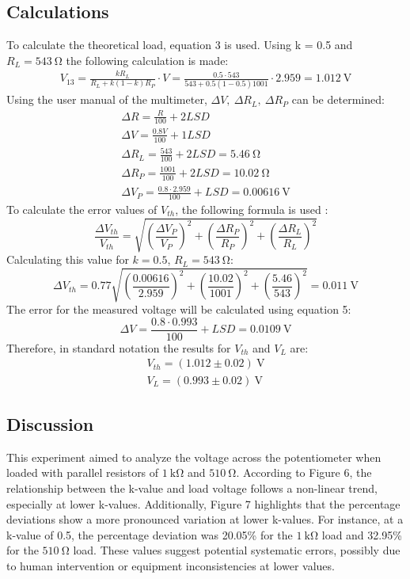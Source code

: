 \documentclass[a4paper]{article}
\newcommand{\unit}[1]{~\mathrm{#1}}
\begin{document}
\subsection{Calculations}
To calculate the theoretical load, equation 3 is used. Using k = 0.5 and $R_L =
543\unit{\Omega}$ the following calculation is made:
\begin{gather*}
    V_{13} = \frac{kR_L}{R_L + k(1-k) R_P} \cdot V = \frac{0.5 \cdot 543}{543 + 0.5(1-0.5)1001} \cdot 2.959 = 1.012\unit{V}
\end{gather*}
Using the user manual of the multimeter, $\Delta V, ~\Delta R_L, ~\Delta R_P$ can
be determined\cite{noauthor_am-500_2019}:
\begin{gather}
    \Delta R = \frac{R}{100} + 2LSD\\
    \Delta V = \frac{0.8 V}{100} + 1LSD\\
    \Delta R_L = \frac{543}{100} + 2LSD = 5.46\unit{\Omega} \nonumber \\
    \Delta R_P = \frac{1001}{100} + 2LSD = 10.02\unit{\Omega} \nonumber \\
    \Delta V_P = \frac{0.8 \cdot 2.959}{100} + LSD = 0.00616\unit{V} \nonumber
\end{gather} 
To calculate the error values of $V_{th}$, the following formula is used \cite{unc}:
\begin{equation}
    \frac{\Delta V_{th}}{V_{th}} = \sqrt{\left( \frac{\Delta V_P}{V_P}\right) ^2 + \left( \frac{\Delta R_P}{R_P} \right) ^ 2 + \left( \frac{\Delta R_L}{R_L} \right) ^2}
\end{equation}
Calculating this value for $k = 0.5$, $R_L = 543\unit{\Omega}$:
\[ \Delta V_{th} = 0.77 \sqrt{\left( \frac{0.00616}{2.959} \right) ^ 2 + \left(
\frac{10.02}{1001} \right) ^2 + \left(\frac{5.46}{543} \right) ^2 } = 0.011
\unit{V} \]
The error for the measured voltage will be calculated using equation 5:
\[ \Delta V = \frac{0.8 \cdot 0.993}{100} + LSD = 0.0109\unit{V} \]
Therefore, in standard notation the results for $V_{th}$ and $V_L$ are:
\begin{gather*}
    V_{th} = (1.012 \pm 0.02) \unit{V}\\
    V_L = (0.993 \pm 0.02) \unit{V}
\end{gather*}

\subsection{Discussion}
This experiment aimed to analyze the voltage across the potentiometer when loaded with parallel resistors 
of $1 \unit{k\Omega}$ and $510\unit{\Omega}$. 
According to Figure 6, the relationship between the k-value and load voltage follows a non-linear trend, 
especially at lower k-values. Additionally, Figure 7 highlights that the percentage deviations show a more 
pronounced variation at lower k-values. For instance, at a k-value of 0.5, the percentage deviation was 20.05\%
for the $1 \unit{k\Omega}$ load and 32.95\% for the $510\unit{\Omega}$ load. 
These values suggest potential systematic errors, possibly due to human intervention or equipment inconsistencies at lower values.
\end{document}
